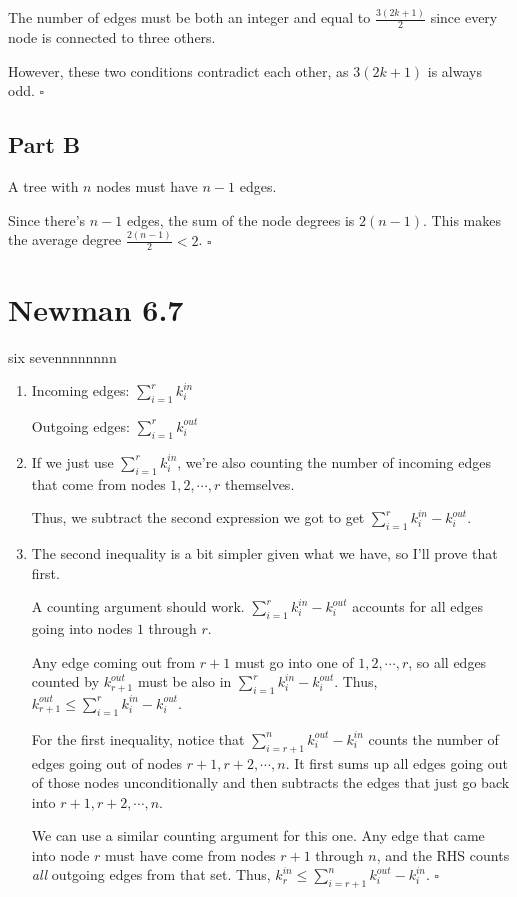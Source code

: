 \documentclass[12pt]{article}
\begin{document}
The number of edges must be both an integer and equal to $\frac{3(2k+1)}{2}$
since every node is connected to three others.

However, these two conditions contradict each other, as $3(2k+1)$ is always odd. $\square$

\subsection{Part B}

A tree with $n$ nodes must have $n-1$ edges.

Since there's $n-1$ edges, the sum of the node degrees is $2(n-1)$.
This makes the average degree $\frac{2(n-1)}{2} < 2$. $\square$

\section{Newman 6.7}

six sevennnnnnnn

\begin{enumerate}
      \item Incoming edges: $\sum_{i=1}^{r} k_i^{in}$

            Outgoing edges: $\sum_{i=1}^{r} k_i^{out}$

      \item If we just use $\sum_{i=1}^{r} k_i^{in}$, we're also counting
            the number of incoming edges that come from nodes $1, 2, \cdots, r$ themselves.

            Thus, we subtract the second expression we got to get
            $\boxed{\sum_{i=1}^{r} k_i^{in}-k_i^{out}}$.

      \item The second inequality is a bit simpler given what we have,
            so I'll prove that first.

            A counting argument should work.
            $\sum_{i=1}^{r} k_i^{in}-k_i^{out}$ accounts for all edges going into nodes $1$ through $r$.

            Any edge coming out from $r+1$ must go into one of $1, 2, \cdots, r$,
            so all edges counted by $k_{r+1}^{out}$ must be also in $\sum_{i=1}^{r} k_i^{in}-k_i^{out}$.
            Thus, $k_{r+1}^{out} \le \sum_{i=1}^{r} k_i^{in}-k_i^{out}$.

            For the first inequality, notice that $\sum_{i=r+1}^{n} k_i^{out}-k_i^{in}$ counts
            the number of edges going out of nodes $r+1, r+2, \cdots, n$.
            It first sums up all edges going out of those nodes unconditionally
            and then subtracts the edges that just go back into $r+1, r+2, \cdots, n$.

            We can use a similar counting argument for this one.
            Any edge that came into node $r$ must have come from nodes $r+1$ through $n$,
            and the RHS counts \textit{all} outgoing edges from that set.
            Thus, $k_r^{in} \le \sum_{i=r+1}^{n} k_i^{out}-k_i^{in}$. $\square$
\end{enumerate}
\end{document}
